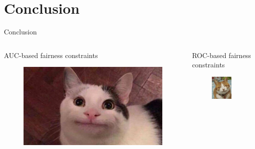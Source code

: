 \section{Conclusion}
\begin{frame}{Conclusion}

    \begin{columns}
        \begin{column}{0.5\textwidth}
            AUC-based fairness constraints
            \begin{figure}
                \centering
                \includegraphics[trim = 6cm 0cm 6cm 0cm, clip, width=0.8\columnwidth]{images/cat.jpg}
            \end{figure}
        \end{column}
        \begin{column}{0.5\textwidth}
            ROC-based fairness constraints
            \begin{figure}
                \centering
                \includegraphics[trim = 0cm 1cm 0cm 0cm, clip, width=0.8\columnwidth]{images/Happy-cat-meme-9.jpg}
            \end{figure}
        \end{column}
    \end{columns}
    
\end{frame}